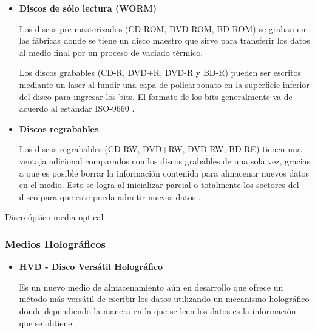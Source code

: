 \begin{itemize}

  \item \textbf{Discos de s\'{o}lo lectura (WORM)}

Los discos pre-masterizados (\textsc{CD-ROM}, \textsc{DVD-ROM}, \textsc{BD-ROM}) se graban en las f\'{a}bricas donde se tiene un disco maestro que sirve para transferir los datos al medio final por un proceso de vaciado t\'{e}rmico.

Los discos grabables (\textsc{CD-R}, \textsc{DVD+R}, \textsc{DVD-R} y \textsc{BD-R}) pueden ser escritos mediante un laser al fundir una capa de policarbonato en la superficie inferior del disco para ingresar los bits. El formato de los bits generalmente va de acuerdo al est\'{a}ndar \textsc{ISO-9660} \cite{_further_????}.

\newpage
  \item \textbf{Discos regrabables}

Los discos regrabables (\textsc{CD-RW}, \textsc{DVD+RW}, \textsc{DVD-RW}, \textsc{BD-RE}) tienen una ventaja adicional comparados con los discos grabables de una sola vez, gracias a que es posible borrar la informaci\'{o}n contenida para almacenar nuevos datos en el medio. Esto se logra al inicializar parcial o totalmente los sectores del disco para que este pueda admitir nuevos datos \cite{_odd_????}.

\end{itemize}

\diagramblock
{Disco \'{o}ptico}
{media-optical}
{
 {
  
 }
}

      \subsubsection*{Medios Hologr\'{a}ficos }

\begin{itemize}

  \item \textbf{HVD - Disco Vers\'{a}til Hologr\'{a}fico}

Es un nuevo medio de almacenamiento a\'{u}n en desarrollo que ofrece un m\'{e}todo m\'{a}s vers\'{a}til de escribir los datos utilizando un mecanismo hologr\'{a}fico donde dependiendo la manera en la que se leen los datos es la informaci\'{o}n que se obtiene \cite{_worlds_2004}.

\end{itemize}

\newpage
